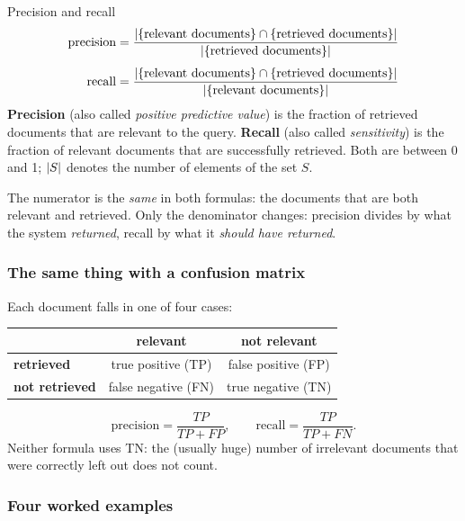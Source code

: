 \begin{nbdef}{Precision and recall}
\begin{align*}
  \text{precision} &= \frac{\lvert \{\text{relevant documents}\} \cap \{\text{retrieved documents}\}\rvert}
                           {\lvert \{\text{retrieved documents}\}\rvert} \\[4pt]
  \text{recall}    &= \frac{\lvert \{\text{relevant documents}\} \cap \{\text{retrieved documents}\}\rvert}
                           {\lvert \{\text{relevant documents}\}\rvert}
\end{align*}
\textbf{Precision} (also called \emph{positive predictive value}) is the fraction of
retrieved documents that are relevant to the query. \textbf{Recall} (also called
\emph{sensitivity}) is the fraction of relevant documents that are successfully
retrieved. Both are between 0 and 1; $\lvert S\rvert$ denotes the number of elements of the
set $S$.
\end{nbdef}

The numerator is the \emph{same} in both formulas: the documents that are both relevant
and retrieved. Only the denominator changes: precision divides by what the system
\emph{returned}, recall by what it \emph{should have returned}.

\subsubsection{The same thing with a confusion matrix}
\notinslides

Each document falls in one of four cases:

\begin{center}
\begin{tabular}{@{}l c c@{}}
\toprule
 & \textbf{relevant} & \textbf{not relevant} \\
\midrule
\textbf{retrieved}     & true positive (TP)  & false positive (FP) \\
\textbf{not retrieved} & false negative (FN) & true negative (TN) \\
\bottomrule
\end{tabular}
\end{center}

\[
  \text{precision} = \frac{TP}{TP + FP}, \qquad
  \text{recall}    = \frac{TP}{TP + FN}.
\]
Neither formula uses TN: the (usually huge) number of irrelevant documents that were
correctly left out does not count.

\subsubsection{Four worked examples}

